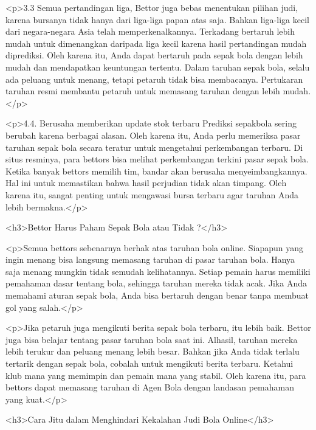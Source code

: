 <p>3.3 Semua pertandingan liga, Bettor juga bebas menentukan pilihan judi, karena bursanya tidak hanya dari liga-liga papan atas saja. Bahkan liga-liga kecil dari negara-negara Asia telah memperkenalkannya. Terkadang bertaruh lebih mudah untuk dimenangkan daripada liga kecil karena hasil pertandingan mudah diprediksi. Oleh karena itu, Anda dapat bertaruh pada sepak bola dengan lebih mudah dan mendapatkan keuntungan tertentu. Dalam taruhan sepak bola, selalu ada peluang untuk menang, tetapi petaruh tidak bisa membacanya. Pertukaran taruhan resmi membantu petaruh untuk memasang taruhan dengan lebih mudah.</p>



<p>4.4. Berusaha memberikan update stok terbaru Prediksi sepakbola sering berubah karena berbagai alasan. Oleh karena itu, Anda perlu memeriksa pasar taruhan sepak bola secara teratur untuk mengetahui perkembangan terbaru. Di situs resminya, para bettors bisa melihat perkembangan terkini pasar sepak bola. Ketika banyak bettors memilih tim, bandar akan berusaha menyeimbangkannya. Hal ini untuk memastikan bahwa hasil perjudian tidak akan timpang. Oleh karena itu, sangat penting untuk mengawasi bursa terbaru agar taruhan Anda lebih bermakna.</p>



<h3>Bettor Harus Paham Sepak Bola atau Tidak ?</h3>



<p>Semua bettors sebenarnya berhak atas taruhan bola online. Siapapun yang ingin menang bisa langsung memasang taruhan di pasar taruhan bola. Hanya saja menang mungkin tidak semudah kelihatannya. Setiap pemain harus memiliki pemahaman dasar tentang bola, sehingga taruhan mereka tidak acak. Jika Anda memahami aturan sepak bola, Anda bisa bertaruh dengan benar tanpa membuat gol yang salah.</p>



<p>Jika petaruh juga mengikuti berita sepak bola terbaru, itu lebih baik. Bettor juga bisa belajar tentang pasar taruhan bola saat ini. Alhasil, taruhan mereka lebih terukur dan peluang menang lebih besar. Bahkan jika Anda tidak terlalu tertarik dengan sepak bola, cobalah untuk mengikuti berita terbaru. Ketahui klub mana yang memimpin dan pemain mana yang stabil. Oleh karena itu, para bettors dapat memasang taruhan di Agen Bola dengan landasan pemahaman yang kuat.</p>



<h3>Cara Jitu dalam Menghindari Kekalahan Judi Bola Online</h3>



